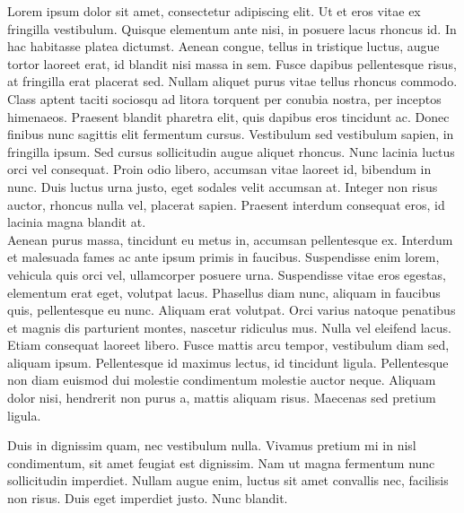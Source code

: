 Lorem ipsum dolor sit amet, consectetur adipiscing elit. Ut et eros vitae ex fringilla vestibulum. Quisque elementum ante nisi, in posuere lacus rhoncus id. In hac habitasse platea dictumst. Aenean congue, tellus in tristique luctus, augue tortor laoreet erat, id blandit nisi massa in sem. Fusce dapibus pellentesque risus, at fringilla erat placerat sed. Nullam aliquet purus vitae tellus rhoncus commodo. Class aptent taciti sociosqu ad litora torquent per conubia nostra, per inceptos himenaeos. Praesent blandit pharetra elit, quis dapibus eros tincidunt ac. Donec finibus nunc sagittis elit fermentum cursus. Vestibulum sed vestibulum sapien, in fringilla ipsum. Sed cursus sollicitudin augue aliquet rhoncus. Nunc lacinia luctus orci vel consequat. Proin odio libero, accumsan vitae laoreet id, bibendum in nunc. Duis luctus urna justo, eget sodales velit accumsan at. Integer non risus auctor, rhoncus nulla vel, placerat sapien. Praesent interdum consequat eros, id lacinia magna blandit at. \\

Aenean purus massa, tincidunt eu metus in, accumsan pellentesque ex. Interdum et malesuada fames ac ante ipsum primis in faucibus. Suspendisse enim lorem, vehicula quis orci vel, ullamcorper posuere urna. Suspendisse vitae eros egestas, elementum erat eget, volutpat lacus. Phasellus diam nunc, aliquam in faucibus quis, pellentesque eu nunc. Aliquam erat volutpat. Orci varius natoque penatibus et magnis dis parturient montes, nascetur ridiculus mus. Nulla vel eleifend lacus. Etiam consequat laoreet libero. Fusce mattis arcu tempor, vestibulum diam sed, aliquam ipsum. Pellentesque id maximus lectus, id tincidunt ligula. Pellentesque non diam euismod dui molestie condimentum molestie auctor neque. Aliquam dolor nisi, hendrerit non purus a, mattis aliquam risus. Maecenas sed pretium ligula.

Duis in dignissim quam, nec vestibulum nulla. Vivamus pretium mi in nisl condimentum, sit amet feugiat est dignissim. Nam ut magna fermentum nunc sollicitudin imperdiet. Nullam augue enim, luctus sit amet convallis nec, facilisis non risus. Duis eget imperdiet justo. Nunc blandit.
